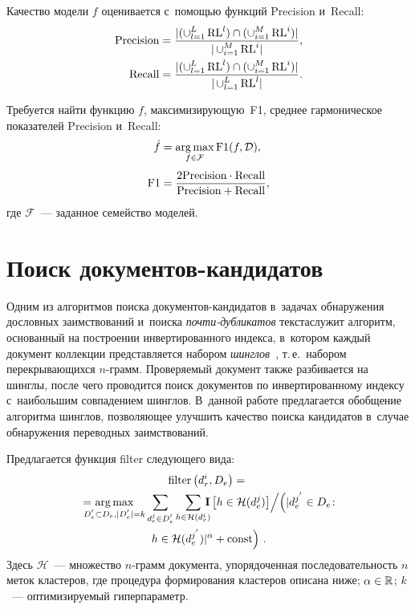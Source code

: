 \begin{multicols}{2}
Качество модели $f$ оценивается с~помощью функций Precision и~Recall:
\begin{align*}
\mbox{Precision}& = \displaystyle\frac{\displaystyle |(\mathop{\cup}\nolimits_{l=1}^L \mathrm{RL}^l) \cap (\mathop{\cup}\nolimits_{i=1}^M 
\mathrm{RL}^{i})|\mathstrut}{\displaystyle |\mathop{\cup}\nolimits_{i=1}^M \mathrm{RL}^i|\mathstrut},\\
\mbox{Recall} &= \displaystyle\frac{\displaystyle |(\mathop{\cup}\nolimits_{l=1}^L \mathrm{RL}^l) \cap (\mathop{\cup}\nolimits_{i=1}^M 
\mathrm{RL}^{i})|\mathstrut}{\displaystyle |\mathop{\cup}\nolimits_{l=1}^L \mathrm{RL}^{l}|\mathstrut}.
\end{align*}

Требуется найти функцию $f$, мак\-си\-ми\-зи\-ру\-ющую~F1, среднее гармоническое 
показателей Precision и~Recall:
\begin{align*}
\hat{f}& = \mathop{\mathrm{arg}\,\mathrm{max}}\limits_{f \in \mathcal{F}}\text{F1}(f, \mathcal{D}), \\[3pt]
 \text{F1} &= \displaystyle\frac{\displaystyle 2  \mbox{Precision} \cdot \mbox{Recall} 
\mathstrut}{\displaystyle \mbox{Precision}+\mbox{Recall}\mathstrut},
\end{align*}
где $\mathcal{F}$~--- заданное семейство моделей.



\section{Поиск документов-кандидатов}

Одним из алгоритмов поиска до\-ку\-мен\-тов-кан\-ди\-да\-тов в~задачах обнаружения дословных 
заимствований и~поиска \textit{поч\-ти-дуб\-ли\-ка\-тов} текста\linebreak служит алгоритм, 
основанный на построении инвертированного индекса, в~котором каждый документ 
коллекции представляется набором \textit{шинглов}~\cite{shingles1}, т.\,е.\ 
набором перекрывающихся $n$-грамм. Про\-ве\-ря\-емый документ также разбивается на 
шинглы, после чего проводится поиск документов по инвертированному индексу 
с~наибольшим совпадением шинглов. В~данной работе предлагается обобщение алгоритма 
шинглов, позволяющее улучшить качество поиска кандидатов в~случае обнаружения 
переводных заимствований.

Предлагается функция filter следующего вида:
\begin{multline*}
\mbox{filter}\left(d_r^i, D_e\right) ={}\\
{}=\! \!\!\!\!\!\argmax\limits_{D_e^{'} \subset D_e, |D_e^{'}|=k}\sum\limits_{d_e^j \in 
D_e^{'}}\sum\limits_{h \in \mathcal{H}(d_r^i)}\!\!\!\! \mathbf{I}\left[h \in 
\mathcal{H}(d_e^j)\right]\! \Big / \!
\left(|d_e^{j^{'}} \in D_e\!:\right.\\
\left. h \in 
\mathcal{H}(d_e^{j^{'}})|^{\alpha} + \mbox{const}\right)\,.
\end{multline*}
Здесь $\mathcal{H}$~--- множество $n$-грамм документа, упорядоченная 
последовательность $n$ меток кластеров, где процедура формирования кластеров 
описана ниже; $\alpha \hm\in \mathbb{R}$; $k$~--- оптимизируемый гиперпараметр.



\end{multicols}
